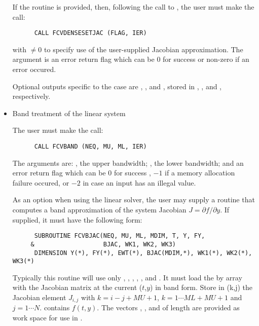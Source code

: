\begin{Steps}
\begin{itemize}
    If the  routine is provided, then, 
    following the call to , the user must make the call:
\begin{verbatim}
      CALL FCVDENSESETJAC (FLAG, IER)
\end{verbatim}
    with $\neq 0$ to specify use of the user-supplied Jacobian approximation.
    The argument  is an error return flag which can be $0$ 
    for success or non-zero if an error occured.

    Optional outputs specific to the {\dense} case are , , and ,
    stored in , , and , respectively.
    
  \item {\s}    Band treatment of the linear system

    The user must make the call:
\begin{verbatim}
      CALL FCVBAND (NEQ, MU, ML, IER)
\end{verbatim}
    The arguments are: , the upper bandwidth; , 
    the lower bandwidth; and  an error return flag which can be  
    $0$ for success , $-1$ if a memory allocation failure occured, or $-2$ 
    in case an input has an illegal value.     

    As an option when using the {\band} linear solver, the user may supply a
    routine that computes a band approximation of the system Jacobian 
    $J = \partial f / \partial y$. If supplied, it must have the following form:
\begin{verbatim}
      SUBROUTINE FCVBJAC(NEQ, MU, ML, MDIM, T, Y, FY,
     &                   BJAC, WK1, WK2, WK3)
      DIMENSION Y(*), FY(*), EWT(*), BJAC(MDIM,*), WK1(*), WK2(*), WK3(*)
\end{verbatim}
    Typically this routine will use only , , , , 
    , and . 
    It must load the  by  array  with the Jacobian matrix at the
    current ($t$,$y$) in band form.  Store in (k,j) the Jacobian element $J_{i,j}$
    with $k = i - j + MU + 1$, $k = 1 \cdots ML+MU+1$ and $j = 1 \cdots N$.
     contains $f(t,y)$. The vectors , , and 
    of length  are provided as work space for use in .


\end{itemize}
\end{Steps}
